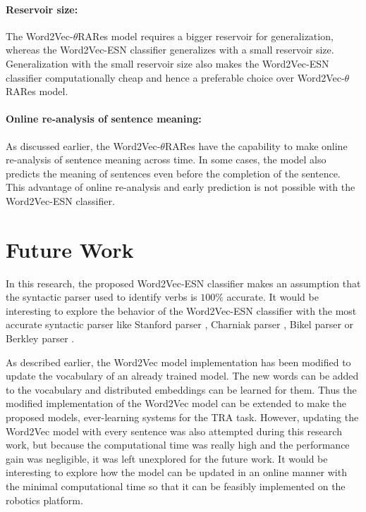 \paragraph{Reservoir size:} The Word2Vec-$\theta$RARes model requires a bigger reservoir for generalization, whereas the Word2Vec-ESN classifier generalizes with a small reservoir size. Generalization with the small reservoir size also makes the Word2Vec-ESN classifier computationally cheap and hence a preferable choice over Word2Vec-$\theta$RARes model.

\paragraph{Online re-analysis of sentence meaning:} As discussed earlier, the Word2Vec-$\theta$RARes have the capability to make online re-analysis of sentence meaning across time. In some cases, the model also predicts the meaning of sentences even before the completion of the sentence. This advantage of online re-analysis and early prediction is not possible with the Word2Vec-ESN classifier.

\section{Future Work}

In this research, the proposed Word2Vec-ESN classifier makes an assumption that the syntactic parser used to identify verbs is $100 \%$ accurate. It would be interesting to explore the behavior of the Word2Vec-ESN classifier with the most accurate syntactic parser like Stanford parser \cite{parser:stanford}, Charniak parser \cite{charniak_parser:2000}, Bikel parser \cite{parser:bikel:2004} or Berkley parser \cite{parser:berkley:2006}.

As described earlier, the Word2Vec model implementation has been modified to update the vocabulary of an already trained model. The new words can be added to the vocabulary and distributed embeddings can be learned for them. Thus the modified implementation of the Word2Vec model can be extended to make the proposed models, ever-learning systems for the TRA task. However, updating the Word2Vec model with every sentence was also attempted during this research work, but because the computational time was really high and the performance gain was negligible, it was left unexplored for the future work. It would be interesting to explore how the model can be updated in an online manner with the minimal computational time so that it can be feasibly implemented on the robotics platform. 

